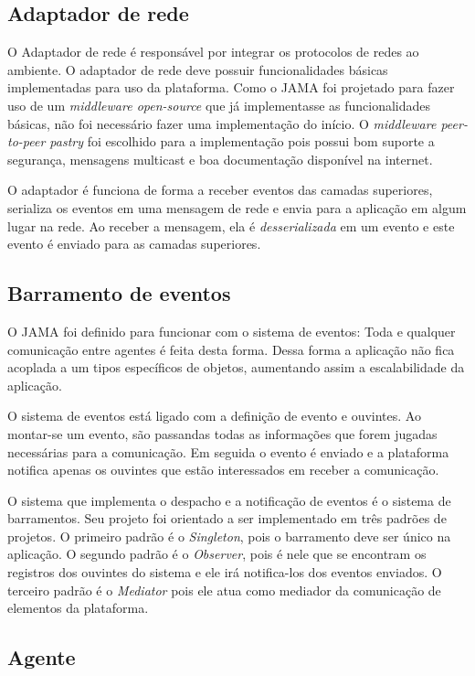 \subsection{Adaptador de rede}

O Adaptador de rede é responsável por integrar os protocolos de redes ao ambiente. O adaptador de rede deve possuir funcionalidades básicas implementadas para uso da plataforma. Como o JAMA foi projetado para fazer uso de um \emph{middleware open-source} que já implementasse as funcionalidades básicas, não foi necessário fazer uma implementação do início. O \emph{middleware peer-to-peer pastry} foi escolhido para a implementação pois possui bom suporte a segurança, mensagens multicast e boa documentação disponível na internet.

O adaptador é funciona de forma a receber eventos das camadas superiores, serializa os eventos em uma mensagem de rede e envia para a aplicação em algum lugar na rede. Ao receber a mensagem, ela é \emph{desserializada} em um evento e este evento é enviado para as camadas superiores.

\subsection{Barramento de eventos}

O JAMA foi definido para funcionar com o sistema de eventos: Toda e qualquer comunicação entre agentes é feita desta forma. Dessa forma a aplicação não fica acoplada a um tipos específicos de objetos, aumentando assim a escalabilidade da aplicação.

O sistema de eventos está ligado com a definição de evento e ouvintes. Ao montar-se um evento, são passandas todas as informações que forem jugadas necessárias para a comunicação. Em seguida o evento é enviado e a plataforma notifica apenas os ouvintes que estão interessados em receber a comunicação.

O sistema que implementa o despacho e a notificação de eventos é o sistema de barramentos. Seu projeto foi orientado a ser implementado em três padrões de projetos. O primeiro padrão é o \emph{Singleton}, pois o barramento deve ser único na aplicação. O segundo padrão é o \emph{Observer}, pois é nele que se encontram os registros dos ouvintes do sistema e ele irá notifica-los dos eventos enviados. O terceiro padrão é o \emph{Mediator} pois ele atua como mediador da comunicação de elementos da plataforma.

\subsection{Agente}

